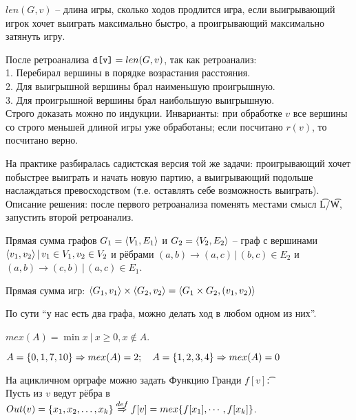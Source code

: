 \begin{Def}
$len(G,v)$ -- длина игры, сколько ходов продлится игра,
если выигрывающий игрок хочет выиграть максимально быстро, а проигрывающий максимально затянуть игру.
\end{Def}

\begin{Rem}
После ретроанализа $\texttt{d[v]} = len(G, v)$, так как ретроанализ: \\
1. Перебирал вершины в порядке возрастания расстояния.\\
2. Для выигрышной вершины брал наименьшую проигрышную.\\
3. Для проигрышной вершины брал наибольшую выигрышную.\\
Строго доказать можно по индукции. 
Инварианты: при обработке $v$ все вершины со строго меньшей длиной игры уже
обработаны; если посчитано $r(v)$, то посчитано верно.
\end{Rem}

\down
\begin{Rem}
На практике разбиралась садистская версия той же задачи: проигрывающий хочет 
побыстрее выиграть и начать новую партию, а выигрывающий подольше
наслаждаться превосходством (т.е. оставлять себе возможность выиграть).
Описание решения: после первого ретроанализа поменять местами смысл \t{L}/\t{W}, запустить второй ретроанализ.
\end{Rem}

\pagebreak
\vspace*{-1.5em}


\up
\begin{Def} 
Прямая сумма графов $G_1 = \langle V_1, E_1 \rangle$ и $G_2 = \langle V_2, E_2 \rangle$ -- 
граф с вершинами \\
$\langle v_1, v_2 \rangle\,|\, v_1 \in V_1, v_2 \in V_2$ и
рёбрами 
$(a, b) \to (a, c)\,|\,(b,c) \in E_2$ и
$(a, b) \to (c, b)\,|\,(a,c) \in E_1$.
\end{Def} 

\begin{Def} 
Прямая сумма игр: $\langle G_1, v_1 \rangle \times \langle G_2, v_2 \rangle = \langle G_1 \times G_2, (v_1, v_2) \rangle$ 
\end{Def} 

\up
По сути ``у нас есть два графа, можно делать ход в любом одном из них''.

\begin{Def} 
$mex(A) = \min x\ |\ x \ge 0, x \not\in A$.
\end{Def}
\begin{Example}
$A = \{0, 1, 7, 10\} \Rightarrow mex(A) = 2; \quad A = \{1, 2, 3, 4\} \Rightarrow mex(A) = 0$
\end{Example}
\begin{Def} 
На ацикличном орграфе можно задать Функцию Гранди $f[v]$\t{:}\\ 
Пусть из $v$ ведут рёбра в $Out(v) = \{x_1, x_2, \dots, x_k\} \overset{def}{\Rightarrow}
f[v] = mex\{f[x_1], \cdots, f[x_k]\}$.
\end{Def}

